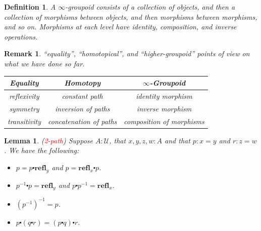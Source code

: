 \documentclass{article}
\newtheorem{lemma}[theorem]{Lemma}
\newtheorem{definition}[theorem]{Definition}
\newtheorem{remark}[theorem]{Remark}
\newcommand{\redt}[1]{\textcolor{red}{#1}}
\newcommand{\refl}{\textbf{refl}}
\begin{document}
\begin{definition}
\rm A $\infty$-groupoid consists of a collection of objects, and then a collection of morphisms between objects, and then morphisms between morphisms, and so on. Morphisms at each level have identity, composition, and inverse operations.
\end{definition}

\begin{remark}
\rm “equality”, “homotopical”, and “higher-groupoid” points of view on what we have done so far. 
\begin{center}
    \begin{tabular}{|c|c|c|}
     \hline Equality & Homotopy & $\infty$-Groupoid \\
     \hline reflexivity & constant path & identity morphism \\
     \hline symmetry & inversion of paths & inverse morphism \\
     \hline transitivity & concatenation of paths & composition of morphisms \\
     \hline
\end{tabular}
\end{center}
\end{remark}

\begin{lemma}
\rm (\redt{2-path}) Suppose $A :\mathcal{U}$, that $x, y, z, w : A$ and that $p : x = y$ and $r : z = w$. We have the following:
\begin{itemize}
    \item $p = p \centerdot \refl_y$ and $p = \refl_x \centerdot p$.
    \item $p^{-1} \centerdot p = \refl_y$ and $p \centerdot p^{-1} = \refl_x$.
    \item $(p^{-1})^{-1} = p$.
    \item $p \centerdot (q \centerdot r) = (p \centerdot q) \centerdot r$.
\end{itemize}
\end{lemma}
\end{document}
